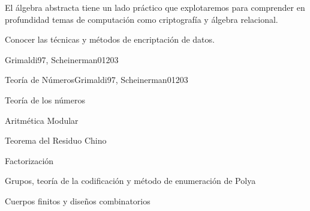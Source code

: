 \begin{syllabus}


\begin{justification}
El álgebra abstracta tiene un lado práctico que explotaremos para
comprender en profundidad temas de computación como criptografía y
álgebra relacional.
\end{justification}

\begin{goals}
\item Conocer las técnicas y métodos de encriptación de datos.
\end{goals}

\begin{outcomes}
\end{outcomes}

\begin{unit}{\ALCryptographicAlgorithmsDef}{Grimaldi97, Scheinerman01}{20}{3}
    \ALCryptographicAlgorithmsAllTopics
    \ALCryptographicAlgorithmsAllObjectives
\end{unit}



\begin{unit}{Teoría de Números}{Grimaldi97, Scheinerman01}{20}{3}
   \begin{topics}
      \item Teoría de los números
      \item Aritmética  Modular
      \item Teorema del Residuo Chino
      \item Factorización
      \item Grupos, teoría de la codificación y método de enumeración de Polya
      \item Cuerpos finitos y diseños combinatorios
   \end{topics}


\end{unit}
\end{syllabus}
